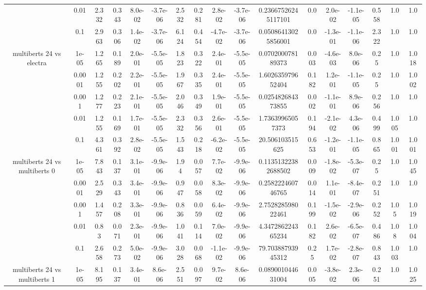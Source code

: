 \begin{tabular}{|c|c|c|c|c|c|c|c|c|c|c|c|c|c|c|c|c|}
 & 0.01 & 2.332 & 0.343 & 8.0e-02 & -3.7e-06 & 2.532 & 0.281 & 2.8e-02 & -3.7e-06 & 0.23667526245117101 & 0.0 & 2.0e-02 & -1.1e-05 & 0.558 & 1.0 & 1.0 \\
 & 0.1 & 2.963 & 0.306 & 1.4e-02 & -3.7e-06 & 6.124 & 0.454 & -4.7e-02 & -3.7e-06 & 0.05086413025856001 & 0.0 & -1.3e-01 & -1.1e-06 & 2.322 & 1.0 & 1.0 \\
\hline
\multirow{5}{*}{multiberts 24 vs electra } & 1e-05 & 1.265 & 0.189 & 2.0e-01 & -5.5e-05 & 1.823 & 0.322 & 2.4e-01 & -5.5e-05 & 0.070200078189373 & 0.003 & -4.6e-03 & 8.0e-06 & 0.25 & 1.0 & 1.018 \\
 & 0.0001 & 1.255 & 0.202 & 2.2e-01 & -5.5e-05 & 1.967 & 0.335 & 2.4e-01 & -5.5e-05 & 1.602635979652404 & 0.182 & 1.2e-01 & -1.1e-05 & 0.25 & 1.0 & 1.002 \\
 & 0.001 & 1.277 & 0.223 & 2.1e-01 & -5.5e-05 & 2.046 & 0.349 & 1.9e-01 & -5.5e-05 & 0.025482684373855 & 0.002 & -1.1e-01 & 8.9e-06 & 0.256 & 1.0 & 1.0 \\
 & 0.01 & 1.255 & 0.169 & 1.7e-01 & -5.5e-05 & 2.332 & 0.356 & 2.6e-01 & -5.5e-05 & 1.73639965057373 & 0.194 & -2.1e-02 & 4.3e-06 & 0.499 & 1.005 & 1.0 \\
 & 0.1 & 4.361 & 0.392 & 2.8e-02 & -5.5e-05 & 1.543 & 0.218 & -6.2e-02 & -5.5e-05 & 20.506103515625 & 0.653 & -1.2e-01 & -1.1e-05 & 0.865 & 1.001 & 1.001 \\
\hline
\multirow{5}{*}{multiberts 24 vs multiberts 0} & 1e-05 & 7.843 & 0.137 & 3.1e-01 & -9.9e-06 & 1.94 & 0.057 & 7.7e-02 & -9.9e-06 & 0.11351322382688502 & 0.009 & -1.8e-02 & -5.3e-07 & 0.25 & 1.0 & 1.045 \\
 & 0.0001 & 2.529 & 0.343 & 3.4e-01 & -9.9e-06 & 0.947 & 0.058 & 8.3e-02 & -9.9e-06 & 0.258222460746765 & 0.014 & 1.1e-01 & -8.4e-07 & 0.251 & 1.0 & 1.0 \\
 & 0.001 & 1.457 & 0.208 & 3.3e-01 & -9.9e-06 & 0.836 & 0.059 & 6.4e-02 & -9.9e-06 & 2.752828598022461 & 0.199 & -1.5e-02 & -2.9e-06 & 0.252 & 1.05 & 1.019 \\
 & 0.01 & 0.83 & 0.071 & 2.3e-01 & -9.9e-06 & 1.041 & 0.114 & 7.0e-02 & -9.9e-06 & 4.347286224365234 & 0.182 & 2.6e-02 & -6.5e-07 & 0.486 & 1.08 & 1.004 \\
 & 0.1 & 2.658 & 0.273 & 5.0e-02 & -9.9e-06 & 3.028 & 0.068 & -1.1e-02 & -9.9e-06 & 79.70388793945312 & 0.25 & 1.7e-02 & -2.8e-07 & 0.843 & 1.003 & 1.0 \\
\hline
\multirow{5}{*}{multiberts 24 vs multiberts 1} & 1e-05 & 8.195 & 0.137 & 3.4e-01 & 8.6e-06 & 2.551 & 0.097 & 9.7e-02 & 8.6e-06 & 0.089001044631004 & 0.005 & -3.8e-02 & 2.3e-06 & 0.251 & 1.0 & 1.025 \\

\end{tabular}
